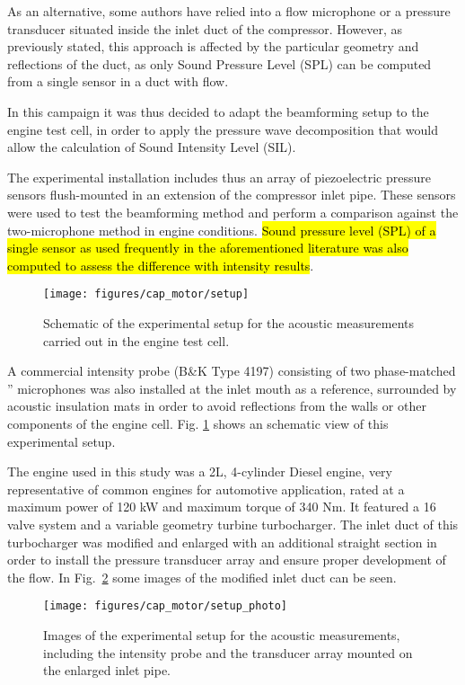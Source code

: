 As an alternative, some authors have relied into a flow microphone or a pressure transducer situated inside the inlet duct of the compressor. However, as previously stated, this approach is affected by the particular geometry and reflections of the duct, as only Sound Pressure Level (SPL) can be computed from a single sensor in a duct with flow.

In this campaign it was thus decided to adapt the beamforming setup to the engine test cell, in order to apply the pressure wave decomposition that would allow the calculation of Sound Intensity Level (SIL).

The experimental installation includes thus an array of piezoelectric pressure sensors flush-mounted in an extension of the compressor inlet pipe. These sensors were used to test the beamforming method and perform a comparison against the two-microphone method in engine conditions. \hl{Sound pressure level (SPL) of a single sensor as used frequently in the aforementioned literature was also computed to assess the difference with intensity results}.

\begin{figure}[t!]
\centering
\null\hspace{1cm}
\texttt{[image: figures/cap\_motor/setup]}
\null\hspace{1cm}
\caption{Schematic of the experimental setup for the acoustic measurements carried out in the engine test cell.}
\label{fig:setup}
\end{figure}

A commercial intensity probe (B\&K Type 4197) consisting of two phase-matched '' microphones was also installed at the inlet mouth as a reference, surrounded by acoustic insulation mats in order to avoid reflections from the walls or other components of the engine cell.  Fig. \ref{fig:setup} shows an schematic view of this  experimental setup.

The engine used in this study was a 2L, 4-cylinder Diesel engine, very representative of common engines for automotive application, rated at a maximum power of 120 kW and maximum torque of 340 Nm. It featured a 16 valve system and a variable geometry turbine turbocharger. The inlet duct of this turbocharger was modified and enlarged with an additional straight section in order to install the pressure transducer array and ensure proper development of the flow. In Fig.~\ref{fig:setup_photo} some images of the modified inlet duct can be seen.

\begin{figure}[hbt!]
\centering
\texttt{[image: figures/cap\_motor/setup\_photo]}
\caption{Images of the experimental setup for the acoustic measurements, including the intensity probe and the transducer array mounted on the enlarged inlet pipe.}
\label{fig:setup_photo}
\end{figure}

